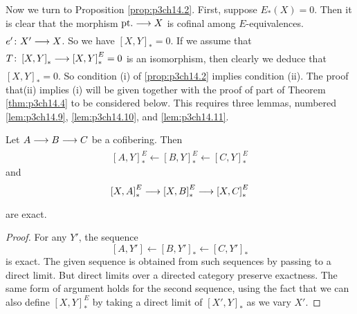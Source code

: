 \documentclass[../main]{subfiles}
\begin{document}
Now we turn to Proposition \ref{prop:p3ch14.2}. First, suppose $E_{\ast}(X)=0$. Then it is clear that the morphism $\te{pt}. \lar{} X$ is cofinal among $E$-equivalences. $e'\colon X' \lar{} X$. So we have $ \left[X,Y\right]_{\ast} = 0$. If we assume that $T\colon \left[X,Y\right]_{\ast} \lar{} \left[X,Y\right]^E_{\ast}=0$ is an isomorphism, then clearly we deduce that $ \left[X,Y\right]_{\ast}=0$. So condition (i) of \ref{prop:p3ch14.2} implies condition (ii). The proof that(ii) implies (i) will be given together with the proof of part of Theorem \ref{thm:p3ch14.4} to be considered below. This requires three lemmas, numbered \ref{lem:p3ch14.9}, \ref{lem:p3ch14.10}, and \ref{lem:p3ch14.11}. 
\begin{lemma} \label{lem:p3ch14.9}
Let $A \lar{} B \lar{} C$ be a cofibering. Then
\[
  \left[A,Y\right]^E_{\ast} \longleftarrow \left[B,Y\right]^E_{\ast} \longleftarrow \left[C,Y\right]^E_{\ast}
\] 
and
\[
  \left[X,A\right]^E_{\ast} \lar{} \left[X,B\right]^E_{\ast} \lar{}  \left[X,C\right]^E_{\ast}
\] 
are exact.
\begin{proof} 
   For any $Y'$, the sequence 
   \[
     \left[A,Y'\right] \longleftarrow \left[B,Y'\right]_{\ast} \longleftarrow \left[C,Y'\right]_{\ast}
   \] 
   is exact. The given sequence is obtained from such sequences by passing to a direct limit. But direct limits over a directed category preserve exactness. The same form of argument holds for the second sequence, using the fact that we can also define $ \left[X,Y\right]^E_{\ast}$ by taking a direct limit of $ \left[X',Y\right]_{\ast}$ as we vary $X'$.
\end{proof}
\end{lemma}
\end{document}
